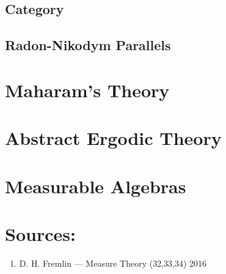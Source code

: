 \documentclass[12pt]{scrartcl}
\renewcommand{\.}{\; . \;}
\begin{document}
\subsection{Category}
\subsection{Radon-Nikodym Parallels}
\section{Maharam's Theory}
\section{Abstract Ergodic Theory}
\section{Measurable Algebras}
\newpage
\section*{Sources:}
\begin{enumerate}
\item  D. H. Fremlin --- Measure Theory (32,33,34) 2016
\end{enumerate}
\end{document}
